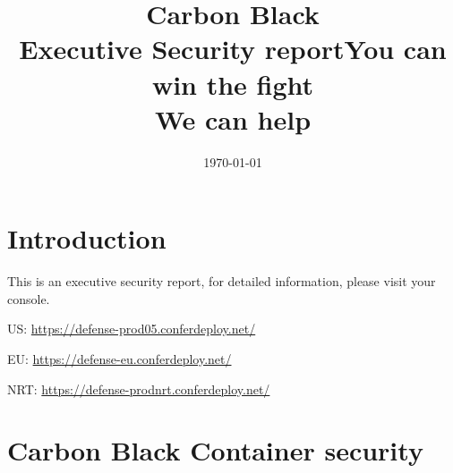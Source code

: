 \documentclass[12pt,letterpaper]{report}
\begin{document}

\thispagestyle{empty}
\bannercbcontainer
\title{Carbon Black\\Executive Security report}

\date{\today}
\logocbcontainer

\newpage

\tableofcontents
\listoftables
\listoffigures

\chapter{Introduction}

This is an executive security report, for detailed information, please visit your console.
\vspace{1cm}

US: \href{https://defense-prod05.conferdeploy.net/}{https://defense-prod05.conferdeploy.net/}

EU: \href{https://defense-eu.conferdeploy.net/}{https://defense-eu.conferdeploy.net/}

NRT: \href{https://defense-prodnrt.conferdeploy.net/}{https://defense-prodnrt.conferdeploy.net/}


%

\chapter{Carbon Black Container security}


%

%



\newpage
\thispagestyle{empty}
\bannercbcontainer
\vspace{2cm}
\title{You can win the fight\\We can help}

\logocbcontainer
\end{document}

